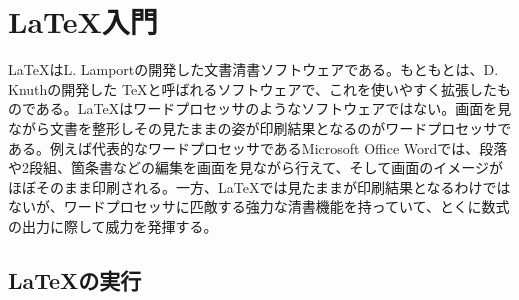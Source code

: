 \chapter{\LaTeX 入門}

\noindent
\LaTeX はL. Lamportの開発した文書清書ソフトウェアである。もともとは、D. Knuthの開発した \TeX と呼ばれるソフトウェアで、これを使いやすく拡張したものである。\LaTeX はワードプロセッサのようなソフトウェアではない。画面を見ながら文書を整形しその見たままの姿が印刷結果となるのがワードプロセッサである。例えば代表的なワードプロセッサであるMicrosoft Office Wordでは、段落や2段組、箇条書などの編集を画面を見ながら行えて、そして画面のイメージがほぼそのまま印刷される。一方、\LaTeX では見たままが印刷結果となるわけではないが、ワードプロセッサに匹敵する強力な清書機能を持っていて、とくに数式の出力に際して威力を発揮する。

\section{\LaTeX の実行}
\label{sec:latex:intro}

